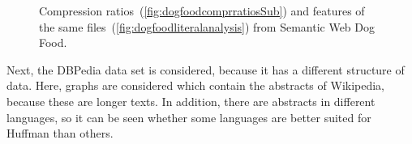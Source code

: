 \begin{figure}[h]
	\centering
	\hfill
	\caption{Compression ratios~(\ref{fig:dogfoodcomprratiosSub}) and features of the same files~(\ref{fig:dogfoodliteralanalysis}) from Semantic Web Dog Food.}
	\label{fig:dogfood}
\end{figure}


Next, the DBPedia data set is considered, because it has a different structure of data. Here, graphs are considered which contain the abstracts of Wikipedia, because these are longer texts. In addition, there are abstracts in different languages, so it can be seen whether some languages are better suited for Huffman than others.

